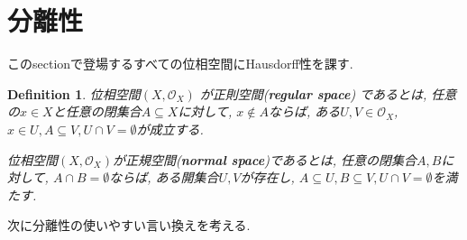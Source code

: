 \documentclass[lualatex]{ltjsbook}
\newtheorem{definition}[theorem]{Definition}
\theoremstyle{remark}
\theoremstyle{plain}
\begin{document}
\section{分離性}
このsectionで登場するすべての位相空間にHausdorff性を課す. 

\begin{definition}
  位相空間$\left( X , \mathcal{O}_{X} \right)$ が正則空間(\textbf{regular space}) であるとは, 
  任意の$x \in X$と任意の閉集合$A \subseteq X$に対して, $x \not\in A$ならば, ある$U ,V \in \mathcal{O}_X$, $x \in U, A \subseteq V, U \cap V =\emptyset$が成立する. 


  位相空間$\left( X , \mathcal{O}_{X} \right)$が正規空間(\textbf{normal space})であるとは, 
  任意の閉集合$A,B$に対して,  $A \cap B = \emptyset$ならば, ある開集合$U,V$が存在し, 
   $A \subseteq U, B \subseteq V, U \cap V =\emptyset$を満たす.
\end{definition}

次に分離性の使いやすい言い換えを考える. 
\begin{proposition}
  
\end{proposition}
\end{document}
